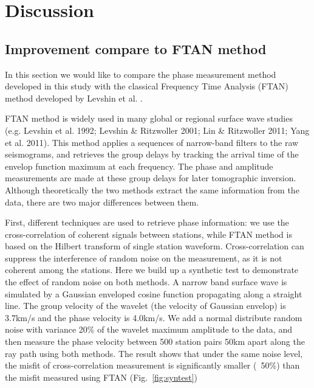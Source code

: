 \documentclass[referee]{gji}
\begin{document}
{{\section{Discussion}

\subsection{Improvement compare to FTAN method}

In this section we would like to compare the phase measurement method developed in this study with the classical Frequency Time Analysis (FTAN) method developed by Levshin et al. . 

FTAN method is widely used in many global or regional surface wave studies (e.g. Levshin et al. 1992; Levshin \& Ritzwoller 2001; Lin \& Ritzwoller 2011; Yang et al. 2011). This method applies a sequences of narrow-band filters to the raw seismograms, and retrieves the group delays by tracking the arrival time of the envelop function maximum at each frequency. The phase and amplitude measurements are made at these group delays for later tomographic inversion. Although theoretically the two methods extract the same information from the data, there are two major differences between them. 

First, different techniques are used to retrieve phase information: we use the cross-correlation of coherent signals between stations, while FTAN method is based on the Hilbert transform of single station waveform. Cross-correlation can suppress the interference of random noise on the measurement, as it is not coherent among the stations. Here we build up a synthetic test to demonstrate the effect of random noise on both methods. A narrow band surface wave is simulated by a Gaussian enveloped cosine function propagating along a straight line. The group velocity of the wavelet (the velocity of Gaussian envelop) is 3.7km/s and the phase velocity is 4.0km/s. We add a normal distribute random noise with variance 20\% of the wavelet maximum amplitude to the data, and then measure the phase velocity between 500 station pairs 50km apart along the ray path using both methods. The result shows that under the same noise level, the misfit of cross-correlation measurement is significantly smaller (~50\%) than the misfit measured using FTAN (Fig.~\ref{fig:syntest})

}}
\end{document}
